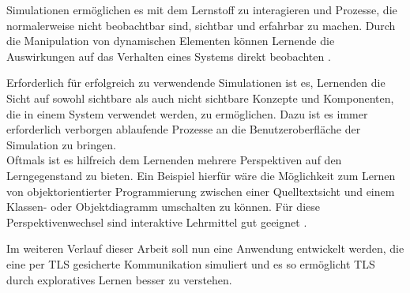 \begin{quote}
 \cite{niegemann08}
\end{quote}

Simulationen ermöglichen es mit dem Lernstoff zu interagieren und Prozesse, die normalerweise nicht beobachtbar sind, sichtbar und erfahrbar zu machen. Durch die Manipulation von dynamischen Elementen können Lernende die Auswirkungen auf das Verhalten eines Systems direkt beobachten \cite{niegemann08}.

Erforderlich für erfolgreich zu verwendende Simulationen ist es, Lernenden die Sicht auf sowohl sichtbare als auch nicht sichtbare Konzepte und Komponenten, die in einem System verwendet werden, zu ermöglichen. Dazu ist es immer erforderlich verborgen ablaufende Prozesse an die Benutzeroberfläche der Simulation zu bringen. \\
Oftmals ist es hilfreich dem Lernenden mehrere Perspektiven auf den Lerngegenstand zu bieten. Ein Beispiel hierfür wäre die Möglichkeit zum Lernen von objektorientierter Programmierung zwischen einer Quelltextsicht und einem Klassen- oder Objektdiagramm umschalten zu können. Für diese Perspektivenwechsel sind interaktive Lehrmittel gut geeignet \cite{schubert11}.

Im weiteren Verlauf dieser Arbeit soll nun eine Anwendung entwickelt werden, die eine per TLS gesicherte Kommunikation simuliert und es so ermöglicht TLS durch exploratives Lernen besser zu verstehen.

